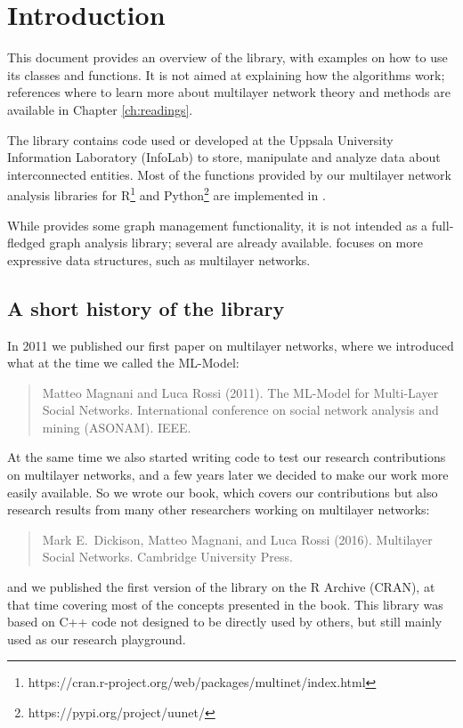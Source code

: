 \chapter{Introduction}

This document provides an overview of the  library, with examples on how to use its classes and functions. It is not aimed at explaining how the algorithms work; references where to learn more about multilayer network theory and methods are available in Chapter \ref{ch:readings}.

The  library contains code used or developed at the Uppsala University Information Laboratory (InfoLab) to store, manipulate and analyze data about interconnected entities. Most of the functions provided by our multilayer network analysis libraries for R\footnote{https://cran.r-project.org/web/packages/multinet/index.html} and Python\footnote{https://pypi.org/project/uunet/} are implemented in .

While  provides some graph management functionality, it is not intended as a full-fledged graph analysis library; several are already available.  focuses on more expressive data structures, such as multilayer networks.


\section{A short history of the library}

In 2011 we published our first paper on multilayer networks, where we introduced what at the time we called the ML-Model: 
\begin{quote}
Matteo Magnani and Luca Rossi (2011). The ML-Model for Multi-Layer Social Networks. International conference on social network analysis and mining (ASONAM). IEEE.
\end{quote}
At the same time we also started writing code to test our research contributions on multilayer networks, and a few years later we decided to make our work more easily available. So we wrote our book, which covers our contributions but also research results from many other researchers working on multilayer networks:
\begin{quote}
Mark E.~Dickison, Matteo Magnani, and Luca Rossi (2016). Multilayer Social Networks. Cambridge University Press.
\end{quote}
and we published the first version of the  library on the R Archive (CRAN), at that time covering most of the concepts presented in the book. This library was based on C++ code not designed to be directly used by others, but still mainly used as our research playground.

